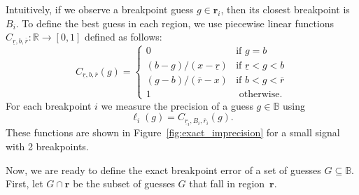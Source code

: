 \documentclass{jsfds} %
\renewcommand{\r}{ \mathbf{ r} }
\newcommand{\rileft}[1][i]{\underline r_{#1}}
\newcommand{\riright}[1][i]{\overline r_{#1}}
\newcommand{\RR}{\mathbb{R}}
\begin{document}
Intuitively, if we observe a breakpoint guess $g\in \r_i$, then its
closest breakpoint is $B_i$. To define the best guess in each region,
we use piecewise linear functions $C_{\underline r,b,\overline r}:\RR\rightarrow[0,1]$
defined as follows:
\begin{equation}
  \label{eq:cLxR}
  C_{\underline r,b,\overline r}(g) =
  \begin{cases}
    0 & \text{if }g=b \\
    (b-g)/(x-\underline r) & \text{if } \underline r< g< b \\
    (g-b)/(\overline r-x) & \text{if } b< g< \overline r\\
    1 & \text{ otherwise}.
  \end{cases}
\end{equation}
For each breakpoint $i$ we measure the precision of a guess
$g\in\mathbb B$ using
\begin{equation}
  \label{eq:ell_i_exact}
  \ell_i(g)=C_{\rileft,B_i,\riright}(g).
\end{equation}
These functions are shown in Figure~\ref{fig:exact_imprecision} for a
small signal with 2 breakpoints.

Now, we are ready to define the exact breakpoint error of a set of
guesses $G\subseteq\mathbb B$.
First, let $G \cap\r$ be the subset of guesses $G$ that fall in
region~$\r$. 
\end{document}
